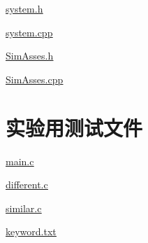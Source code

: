 \documentclass[a4paper]{article}
\begin{document}
    \href{../exp6/system.h.txt}{\underline{system.h}}

    \href{../exp6/system.cpp.txt}{\underline{system.cpp}}

    \href{../exp6/SimAsses.h.txt}{\underline{SimAsses.h}}

    \href{../exp6/SimAsses.cpp.txt}{\underline{SimAsses.cpp}}


    \section{实验用测试文件}\label{sec:appendix2}
    \href{../exp6/file/main.c.txt}{\underline{main.c}}

    \href{../exp6/file/different.c.txt}{\underline{different.c}}

    \href{../exp6/file/similar.c.txt}{\underline{similar.c}}

    \href{../exp6/file/keyword.txt}{\underline{keyword.txt}}
\end{document}
